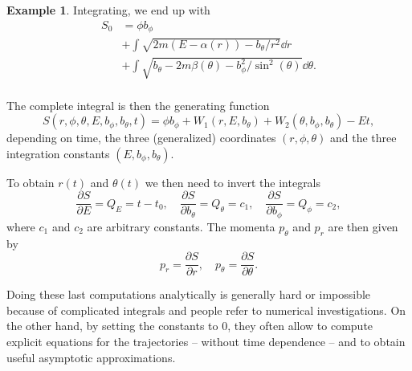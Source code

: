 \documentclass[english,fontsize=11pt,paper=b5]{scrbook}
\numberwithin{equation}{chapter}
\theoremstyle{definition}
\newtheorem{example}{Example}[chapter]
\begin{document}
\begin{example}
      Integrating, we end up with
      \begin{align}
        S_0 & = \phi b_\phi                                                               \\
            & + \int\sqrt{2m(E-\alpha(r))-{b_\theta}/{r^2}}\dd r                           \\
            & + \int\sqrt{b_\theta-2m\beta(\theta)-{b_\phi^2}/{\sin^2(\theta)}}\dd \theta. \\
      \end{align}

      The complete integral is then the generating function
      \begin{equation}
        S(r,\phi,\theta,E,b_\phi,b_\theta,t) =
        \phi b_\phi
        + W_1(r, E, b_\theta)
        + W_2(\theta, b_\phi, b_\theta)
        - E t,
      \end{equation}
      depending on time, the three (generalized) coordinates $(r,\phi,\theta)$ and the three integration constants $(E,b_\phi,b_\theta)$.

      To obtain $r(t)$ and $\theta(t)$ we then need to invert the integrals
      \begin{equation}
        \frac{\partial S}{\partial E} = Q_E = t-t_0, \quad
        \frac{\partial S}{\partial b_\theta} = Q_\theta = c_1, \quad
        \frac{\partial S}{\partial b_\phi} = Q_\phi = c_2,
      \end{equation}
      where $c_1$ and $c_2$ are arbitrary constants.
      The momenta $p_\theta$ and $p_r$ are then given by
      \begin{equation}
        p_r = \frac{\partial S}{\partial r}, \quad
        p_\theta = \frac{\partial S}{\partial \theta}.
      \end{equation}

      Doing these last computations analytically is generally hard or impossible because of complicated integrals and people refer to numerical investigations.
      On the other hand, by setting the constants to $0$, they often allow to compute explicit equations for the trajectories -- without time dependence -- and to obtain useful asymptotic approximations.
    \end{example}
\end{document}
